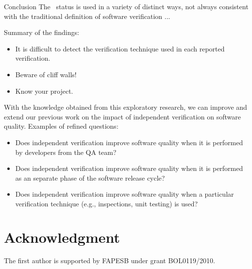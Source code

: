 \begin{section}{Conclusion} \label{sec:conclusion}
  The \VERIFIED\ status is used in a variety of distinct ways, not always consistent with the traditional definition of software verification ...
	
	Summary of the findings:
	\begin{itemize}
		\item It is difficult to detect the verification technique used in each reported verification. 
		\item Beware of cliff walls!
		\item Know your project. 
	\end{itemize}
	
	With the knowledge obtained from this exploratory research, we can improve and extend our previous work on the impact of independent verification on software quality. Examples of refined questions:
	
	\begin{itemize}
		\item Does independent verification improve software quality when it is performed by developers from the QA team?
		\item Does independent verification improve software quality when it is performed as an separate phase of the software release cycle?
		\item Does independent verification improve software quality when a particular verification technique (e.g., inspections, unit testing) is used?
	\end{itemize}
	
\end{section}

\section*{Acknowledgment}

The first author is supported by FAPESB under grant BOL0119/2010.
